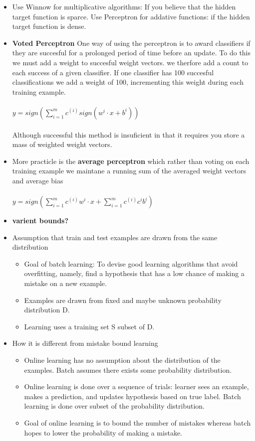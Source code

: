\documentclass{article}
\begin{document}
\begin{itemize}
\begin{itemize}
	\item Use Winnow for multiplicative algorithms: If you believe that the hidden target function is sparce. Use Perceptron for addative functions: if the hidden target function is dense. 
	\item \textbf{Voted Perceptron} One way of using the perceptron is to award classifiers if they are succesful for a prolonged period of time before an update. To do this we must add a weight to succesful weight vectors. we therfore add a count to each success of a given classifier. If one classifier has 100 succesful classifications we add a weight of 100, incrementing this weight during each training example.\\
	\\$y = sign( \sum_{i=1}^{m}c^{(i)}sign(w^i \cdot x + b^i))$\\
	\\ Although successful this method is insuficient in that it requires you store a mass of weighted weight vectors.
	\item More practicle is the \textbf{average perceptron} which rather than voting on each training example we maintane a running sum of the averaged weight vectors and average bias\\
	\\$y = sign( \sum_{i=1}^{m}c^{(i)}w^i \cdot x + \sum_{i=1}^{m}c^{(i)}c^ib^i)$
	\\
	\item \textbf{varient bounds?}
	\end{itemize}
\end{itemize}

\hspace{-1.5em}{\large \bf Batch Learning}
\begin{itemize}
\item Assumption that train and test examples are drawn from the same distribution 
	\begin{itemize}
	\item Goal of batch learning: To devise good learning algorithms that avoid overfitting, namely, find a hypothesis that has a low chance of making a mistake on a new example. 
	\item Examples are drawn from fixed and maybe unknown probability distribution D.
	\item Learning uses a training set S subset of D.
	\end{itemize}
\item How it is different from mistake bound learning
	\begin{itemize}
	\item Online learning has no assumption about the distribution of the examples. Batch assumes there exists some probability distribution. 
	\item Online learning is done over a sequence of trials: learner sees an example, makes a prediction, and updates hypothesis based on true label. Batch learning is done over subset of the probability distribution.
	\item Goal of online learning is to bound the number of mistakes whereas batch hopes to lower the probability of making a mistake. 
	\end{itemize}
\end{itemize}
\end{document}
